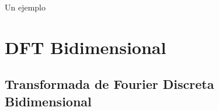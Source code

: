 \documentclass[11pt,compress]{beamer}
\begin{document}
\begin{frame}{Un ejemplo}
{}
\end{frame}

\section{DFT Bidimensional}

\subsection{Transformada de Fourier Discreta Bidimensional}
\end{document}
